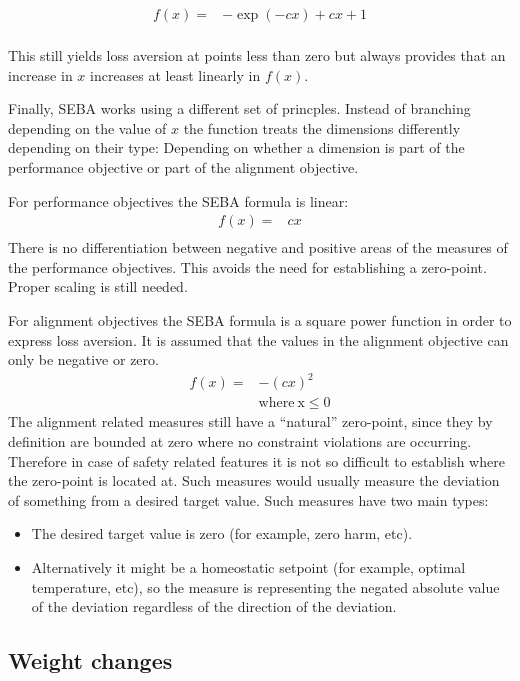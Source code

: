 \begin{align}
f(x)= &  -\exp(-cx)+cx+1 \\ \nonumber
\end{align}

This still yields loss aversion at points less than zero but always provides that an increase in $x$ increases at least linearly in $f(x)$.


Finally, SEBA works using a different set of princples. Instead of branching depending on the value of $x$ the function treats the dimensions differently depending on their type: Depending on whether a dimension is part of the performance objective or part of the alignment objective.

For performance objectives the SEBA formula is linear:
\begin{align}
f(x)= &  cx \\ \nonumber
\end{align}
There is no differentiation between negative and positive areas of the measures of the performance objectives. This avoids the need for establishing a zero-point. Proper scaling is still needed.

For alignment objectives the SEBA formula is a square power function in order to express loss aversion. It is assumed that the values in the alignment objective can only be negative or zero.
\begin{align}
f(x)= &  -(cx)^2 \\ \nonumber
  &  \mathrm{ where \: x \leq 0}
\end{align}
The alignment related measures still have a “natural” zero-point, since they by definition are bounded at zero where no constraint violations are occurring. Therefore in case of safety related features it is not so difficult to establish where the zero-point is located at. Such measures would usually measure the deviation of something from a desired target value. Such measures have two main types:
\begin{itemize}
    \item The desired target value is zero (for example, zero harm, etc).
    \item Alternatively it might be a homeostatic setpoint (for example, optimal temperature, etc), so the measure is representing the negated absolute value of the deviation regardless of the direction of the deviation.
\end{itemize}

\subsection{Weight changes}

